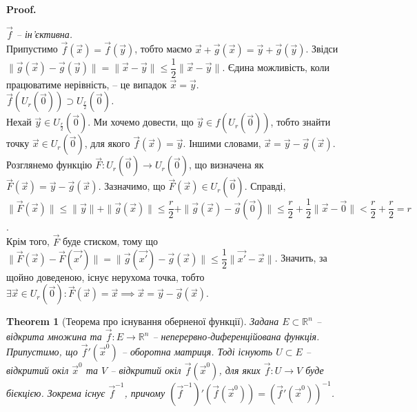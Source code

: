 \documentclass[a4paper, 10pt]{article}
\makeatletter
\theoremstyle{theoremdd}
\newtheorem{theorem}{Theorem}[subsection]
\theoremstyle{theoremdd}
\theoremstyle{theoremdd}
\theoremstyle{theoremdd}
\theoremstyle{theoremdd}
\theoremstyle{theoremdd}
\theoremstyle{theoremdd}
\theoremstyle{theoremdd}
\theoremstyle{theoremdd}
\renewenvironment{proof}[1][Proof.\\]{\par
\pushQED{\hfill \qed}%
\normalfont \topsep6\p@\@plus6\p@\relax
\trivlist
\item\relax
{\bfseries
#1\@addpunct{.}}\hspace\labelsep\ignorespaces
}{%
\popQED\endtrivlist\@endpefalse
}
\makeatother
\begin{document}
\begin{proof}
\textit{$\vec{f}$ -- ін'єктивна.}\\
Припустимо $\vec{f}(\vec{x}) = \vec{f}(\vec{y})$, тобто маємо $\vec{x} + \vec{g}(\vec{x}) = \vec{y} + \vec{g}(\vec{y})$. Звідси $\| \vec{g}(\vec{x}) - \vec{g}(\vec{y}) \| = \| \vec{x} - \vec{y} \| \leq \dfrac{1}{2} \| \vec{x} - \vec{y} \|$. Єдина можливість, коли працюватиме нерівність, -- це випадок $\vec{x} = \vec{y}$.
\bigskip \\
\textit{$\vec{f}(U_r(\vec{0})) \supset U_{\frac{r}{2}}(\vec{0})$.}\\
Нехай $\vec{y} \in U_{\frac{r}{2}}(\vec{0})$. Ми хочемо довести, що $\vec{y} \in f(U_r(\vec{0}))$, тобто знайти точку $\vec{x} \in U_r(\vec{0})$, для якого $\vec{f}(\vec{x}) = \vec{y}$. Іншими словами, $\vec{x} = \vec{y} - \vec{g}(\vec{x})$.\\
Розглянемо функцію $\vec{F} \colon U_r(\vec{0}) \to U_r(\vec{0})$, що визначена як $\vec{F}(\vec{x}) = \vec{y} - \vec{g}(\vec{x})$. Зазначимо, що $\vec{F}(\vec{x}) \in U_r(\vec{0})$. Справді,\\
$\| \vec{F}(\vec{x}) \| \leq \|\vec{y}\| + \|\vec{g}(\vec{x})\| \leq \dfrac{r}{2} + \| \vec{g}(\vec{x}) - \vec{g}(\vec{0}) \| \leq \dfrac{r}{2} + \dfrac{1}{2} \|\vec{x} - \vec{0}\| < \dfrac{r}{2} + \dfrac{r}{2} = r$.\\
Крім того, $\vec{F}$ буде стиском, тому що $\| \vec{F}(\vec{x}) - \vec{F}(\vec{x'}) \| = \| \vec{g}(\vec{x'}) - \vec{g}(\vec{x}) \| \leq \dfrac{1}{2} \|\vec{x'} - \vec{x}\|$. Значить, за щойно доведеною, існує нерухома точка, тобто $\exists \vec{x} \in U_r(\vec{0}): \vec{F}(\vec{x}) = \vec{x} \implies \vec{x} = \vec{y} - \vec{g}(\vec{x})$.
\end{proof}

\begin{theorem}[Теорема про існування оберненої функції]
Задана $E \subset \mathbb{R}^n$ -- відкрита множина та $\vec{f} \colon E \to \mathbb{R}^n$ -- неперервно-диференційована функція. Припустимо, що $\vec{f}'(\vec{x}^0)$ -- оборотна матриця. Тоді існують $U \subset E$ -- відкритий окіл $\vec{x}^0$ та $V$ -- відкритий окіл $\vec{f}(\vec{x}^0)$, для яких $\vec{f} \colon U \to V$ буде бієкцією. Зокрема існує $\vec{f}^{-1}$, причому $(\vec{f}^{-1})'(\vec{f}(\vec{x}^0)) = (\vec{f}'(\vec{x}^0))^{-1}$.
\end{theorem}
\end{document}
